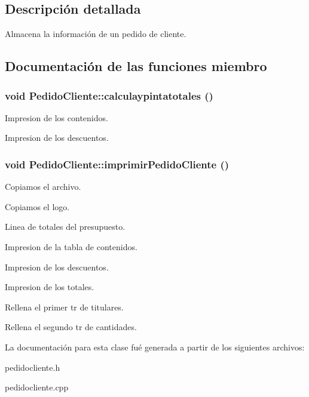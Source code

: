 \subsection{Descripci\'{o}n detallada}
Almacena la informaci\'{o}n de un pedido de cliente. 



\subsection{Documentaci\'{o}n de las funciones miembro}
\subsubsection{\setlength{\rightskip}{0pt plus 5cm}void Pedido\-Cliente::calculaypintatotales ()\hspace{0.3cm}{\tt  [virtual]}}\label{classPedidoCliente_a1}


Impresion de los contenidos.

Impresion de los descuentos. 
\subsubsection{\setlength{\rightskip}{0pt plus 5cm}void Pedido\-Cliente::imprimir\-Pedido\-Cliente ()\hspace{0.3cm}{\tt  [virtual]}}\label{classPedidoCliente_a6}


Copiamos el archivo.

Copiamos el logo.

Linea de totales del presupuesto.

Impresion de la tabla de contenidos.

Impresion de los descuentos.

Impresion de los totales.

Rellena el primer tr de titulares.

Rellena el segundo tr de cantidades. 

La documentaci\'{o}n para esta clase fu\'{e} generada a partir de los siguientes archivos:\begin{CompactItemize}
\item 
pedidocliente.h\item 
pedidocliente.cpp\end{CompactItemize}
